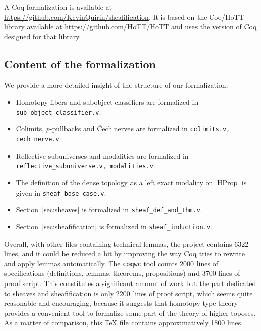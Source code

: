 \documentclass[conference]{IEEEtran}
\DeclareMathOperator{\HProp}{HProp}
\begin{document}
A Coq formalization is available at
\url{https://github.com/KevinQuirin/sheafification}.
%
It is based on the Coq/HoTT library available at
\url{https://github.com/HoTT/HoTT} and uses the version of Coq
designed for that library.
%

\subsection{Content of the formalization}

We provide a more detailed insight of the structure of our formalization:
\begin{itemize} 
\item  Homotopy fibers and subobject classifiers are formalized in
\texttt{sub\_object\_classifier.v}.%
%
\item Colimits, $p$-pullbacks and \v{C}ech nerves are formalized in
\texttt{colimits.v, cech\_nerve.v}.%
\item
Reflective subuniverses and modalities are formalized in
\texttt{reflective\_subuniverse.v, modalities.v}. %
\item 
%
  The definition of the dense topology as a left exact modality on
  $\HProp$ is given in \texttt{sheaf\_base\_case.v}. %
\item
Section~\ref{sec:sheaves} is formalized in
\texttt{sheaf\_def\_and\_thm.v}. %
\item
Section~\ref{sec:sheafification} is formalized in
\texttt{sheaf\_induction.v}. %
\end{itemize}

Overall, with other files containing technical lemmas, the project
contains 6322 lines, and it could be reduced a bit by improving the
way Coq tries to rewrite and apply lemmas automatically. 
The \texttt{coqwc} tool counts 2000 lines of specifications
(definitions, lemmas, theorems, propositions) and 3700 lines of proof
script.
%
This constitutes a significant amount of work but the part dedicated
to sheaves and sheafification is only 2200 lines of proof script,
which seems quite reasonable and encouraging, because it suggests
that homotopy type theory provides a convenient tool to formalize some
part of the theory of higher toposes. As a matter of comparison, this
\TeX\xspace file contains approximatively 1800 lines.
\end{document}
